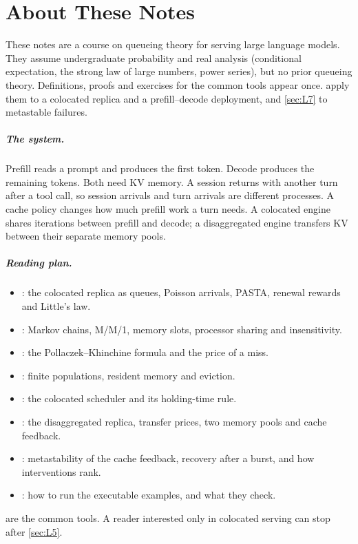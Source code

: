\chapter*{About These Notes}
These notes are a course on queueing theory for serving large language models.
They assume undergraduate probability and real analysis (conditional expectation,
the strong law of large numbers, power series), but no prior queueing theory.
Definitions, proofs and exercises for the common tools appear once. 
apply them to a colocated replica and a prefill--decode deployment, and \cref{sec:L7}
to metastable failures.

\paragraph{The system.} Prefill reads a prompt and produces the first token.
Decode produces the remaining tokens. Both need KV memory. A session returns
with another turn after a tool call, so session arrivals and turn arrivals are
different processes. A cache policy changes how much prefill work a turn needs.
A colocated engine shares iterations between prefill and decode; a disaggregated
engine transfers KV between their separate memory pools.

\paragraph{Reading plan.}
\begin{itemize}
\item {}: the colocated replica as queues, Poisson arrivals, PASTA,
  renewal rewards and Little's law.
\item {}: Markov chains, M/M/1, memory slots, processor sharing and
  insensitivity.
\item {}: the Pollaczek--Khinchine formula and the price of a miss.
\item {}: finite populations, resident memory and eviction.
\item {}: the colocated scheduler and its holding-time rule.
\item {}: the disaggregated replica, transfer prices, two memory pools and
  cache feedback.
\item {}: metastability of the cache feedback, recovery after a burst, and
  how interventions rank.
\item {}: how to run the executable examples, and what they check.
\end{itemize}
 are the common tools. A reader interested only in
colocated serving can stop after \cref{sec:L5}.

